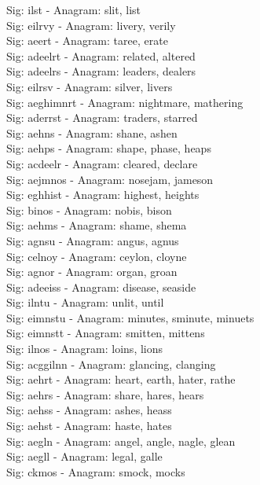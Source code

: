 Sig: {ilst} - Anagram: slit, list \\
Sig: {eilrvy} - Anagram: livery, verily \\
Sig: {aeert} - Anagram: taree, erate \\
Sig: {adeelrt} - Anagram: related, altered \\
Sig: {adeelrs} - Anagram: leaders, dealers \\
Sig: {eilrsv} - Anagram: silver, livers \\
Sig: {aeghimnrt} - Anagram: nightmare, mathering \\
Sig: {aderrst} - Anagram: traders, starred \\
Sig: {aehns} - Anagram: shane, ashen \\
Sig: {aehps} - Anagram: shape, phase, heaps \\
Sig: {acdeelr} - Anagram: cleared, declare \\
Sig: {aejmnos} - Anagram: nosejam, jameson \\
Sig: {eghhist} - Anagram: highest, heights \\
Sig: {binos} - Anagram: nobis, bison \\
Sig: {aehms} - Anagram: shame, shema \\
Sig: {agnsu} - Anagram: angus, agnus \\
Sig: {celnoy} - Anagram: ceylon, cloyne \\
Sig: {agnor} - Anagram: organ, groan \\
Sig: {adeeiss} - Anagram: disease, seaside \\
Sig: {ilntu} - Anagram: unlit, until \\
Sig: {eimnstu} - Anagram: minutes, sminute, minuets \\
Sig: {eimnstt} - Anagram: smitten, mittens \\
Sig: {ilnos} - Anagram: loins, lions \\
Sig: {acggilnn} - Anagram: glancing, clanging \\
Sig: {aehrt} - Anagram: heart, earth, hater, rathe \\
Sig: {aehrs} - Anagram: share, hares, hears \\
Sig: {aehss} - Anagram: ashes, heass \\
Sig: {aehst} - Anagram: haste, hates \\
Sig: {aegln} - Anagram: angel, angle, nagle, glean \\
Sig: {aegll} - Anagram: legal, galle \\
Sig: {ckmos} - Anagram: smock, mocks \\
